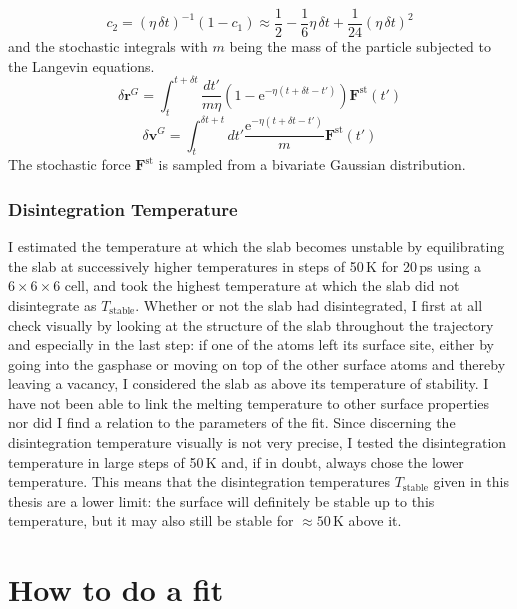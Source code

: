 \documentclass[twoside, 11pt, titlepage, captions=nooneline, a4paper, headsepline]{scrbook}%
\newcommand{\9}{\mathrm}
\newcommand{\0}{\,\mathrm}
\begin{document}
\begin{equation}
c_2=(\eta\,\delta t)^{-1}(1-c_1)\approx \frac{1}{2}-\frac{1}{6}\eta\,\delta t+\frac{1}{24}(\eta\,\delta t)^2
\end{equation}
and the stochastic integrals with $m$ being the mass of the particle subjected to the Langevin equations.
\begin{equation}
\delta \mathbf{r}^G=\int_t^{t+\delta t} \frac{dt'}{m \eta}(1-\mathrm{e}^{-\eta(t+\delta t-t')})\mathbf{F}^\mathrm{st}(t')
\end{equation}
\begin{equation}
\delta \mathbf{v}^G=\int_t^{\delta t+t} dt' \frac{\mathrm{e}^{-\eta(t+\delta t-t')}}{m}\mathbf{F}^\mathrm{st}(t')
\end{equation}
The stochastic force $\mathbf{F}^\mathrm{st}$ is sampled from a bivariate Gaussian distribution.



\subsection{Disintegration Temperature}
I estimated the temperature at which the slab becomes unstable by equilibrating the slab at successively higher temperatures in steps of 50\,K for 20\,ps using a $6\times6\times6$ cell, and took the highest temperature at which the slab did not disintegrate as $T_\mathrm{stable}$. Whether or not the slab had disintegrated, I first at all check visually by looking at the structure of the slab throughout the trajectory and especially in the last step: if one of the atoms left its surface site, either by going into the gasphase or moving on top of the other surface atoms and thereby leaving a vacancy, I considered the slab as above its temperature of stability. I have not been able to link the melting temperature to other surface properties nor did I find a relation to the parameters of the fit. Since discerning the disintegration temperature visually is not very precise, I tested the disintegration temperature in large steps of 50\,K and, if in doubt, always chose the lower temperature. This means that the disintegration temperatures $T_\mathrm{stable}$ given in this thesis are a lower limit: the surface will definitely be stable up to this temperature, but it may also still be stable for $\approx 50$\,K above it. 



\chapter{How to do a fit}
\end{document}
